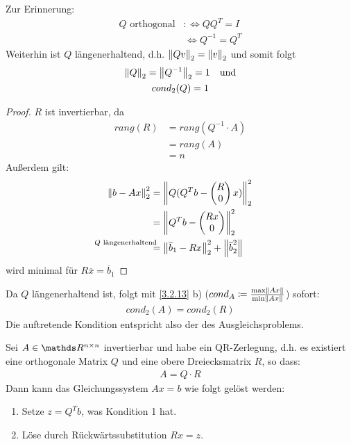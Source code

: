 Zur Erinnerung:
\begin{align*}
  Q \text{ orthogonal} &:\Leftrightarrow QQ^T = I \\
                       &\, \Leftrightarrow Q^{-1} = Q^T
\end{align*}
Weiterhin ist $Q$ längenerhaltend, d.h. $\left\| Qv \right\|_2 = \left\| v \right\|_2$ 
und somit folgt
\begin{gather}
  \nonumber
  \left\| Q \right\|_2 = \left\| Q^{-1} \right\|_2 = 1 \quad \text{und} \\
  cond_2(Q) = 1
  \label{IV.3.11}
\end{gather}

\begin{proof} $R$ ist invertierbar, da 
  \begin{align*}
    rang(R) &= rang(Q^{-1}\cdot A) \\	
            & = rang(A) \\
            &= n
  \end{align*}
  Außerdem gilt:
  \begin{align*}
    \nn{b-Ax}_2^2 & = \nn{Q(Q^Tb-\begin{pmatrix}R\\0\end{pmatrix}x)}_2^2 \\
                  &=  \nn{Q^Tb-\begin{pmatrix}Rx\\0\end{pmatrix}}_2^2  \\
                  &\overset{\mathllap{\text{$Q$ längenerhaltend}}}{=}
                    \nn{\overline{b}_1 - Rx}_2^2  + \nn{\overline{b}_2^2}
  \end{align*}
  wird minimal für $R\overline{x} = \overline{b}_1$
\end{proof}

Da $Q$ längenerhaltend ist, folgt mit \ref{3.2.13} b)
($cond_A \coloneqq \frac{\max \left\| Ax \right\|}{\min \left\| Ax \right\|}$)
sofort:
\begin{gather*}
  cond_2(A) = cond_2(R)
\end{gather*}
Die auftretende Kondition entspricht also der des Ausgleichsproblems.


\begin{Beme}
  Sei $A\in \Renn$ invertierbar und habe ein QR-Zerlegung, d.h. es existiert
  eine orthogonale Matrix $Q$ und eine obere Dreiecksmatrix $R$, so dass:
  \begin{gather*}
    A= Q\cdot R
  \end{gather*}
  Dann kann das Gleichungssystem $Ax=b$ wie folgt gelöst werden:
  \begin{enumerate}[1.]
  \item Setze $z=Q^Tb$, was Kondition 1 hat.
  \item Löse durch Rückwärtssubstitution $Rx=z$.
  \end{enumerate}
\end{Beme}


